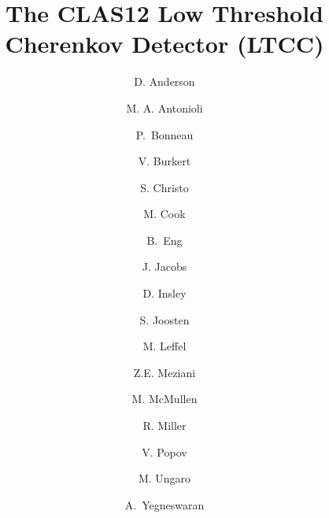 \title{The CLAS12 Low Threshold Cherenkov Detector (LTCC)}


\author[A]{D. Anderson}     %
\author[A]{M. A. Antonioli} %
\author[A]{P.~Bonneau}      %
\author[A]{V. Burkert}      %
\author[A]{S. Christo}      %
\author[A]{M. Cook}         %
\author[A]{B.~Eng}          %
\author[A]{J. Jacobs}       %
\author[A]{D. Insley}       %
\author[B]{S. Joosten}      %
\author[A]{M. Leffel}       %
\author[B]{Z.E. Meziani}    %
\author[A]{M. McMullen}     %
\author[A]{R. Miller}       %
\author[A]{V. Popov}        %
\author[A]{M. Ungaro}       %
\author[A]{A.~Yegneswaran}  %


\address[A]{Thomas Jefferson National Accelerator Facility, Newport News, VA, USA}
\address[B]{Temple University, Philadelphia, PA, USA}
